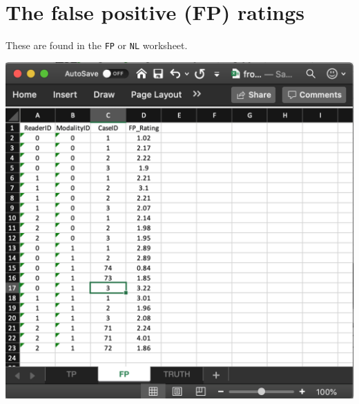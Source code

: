 \documentclass[
]{book}
\begin{document}
\hypertarget{quick-start-froc-data-fp}{%
\section{The false positive (FP) ratings}\label{quick-start-froc-data-fp}}

These are found in the \texttt{FP} or \texttt{NL} worksheet.

\includegraphics[width=1\textwidth,height=\textheight]{images/quick-start/frocCrNL.png}
\end{document}
